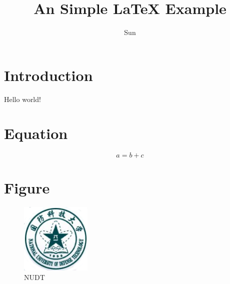 \documentclass{article}
\title{An Simple {\LaTeX} Example}
\author{Sun}
\begin{document}
   \maketitle
   \section{Introduction}
   Hello world!
   \section{Equation}
   \begin{equation}
       a = b + c
   \end{equation}
   \section{Figure}
   \begin{figure}[htbp]
       \centering
       \includegraphics[width=0.3\textwidth]{logo.png}
       \caption{NUDT}
   \end{figure}
\end{document}
